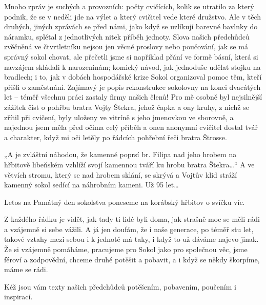 \documentclass[11pt]{article}
\begin{document}
Mnoho zpráv je suchých a provozních: počty cvičících, kolik se utratilo
za který podnik, že se v neděli jde na výlet a který cvičitel vede které
družstvo. Ale v těch druhých, jiných zprávách se před námi, jako když se
uzlíkují barevné bavlnky do náramku, splétal z jednotlivých nitek příběh
jednoty. Slova našich předchůdců zvěčněná ve čtvrtletníku nejsou jen
věcné proslovy nebo poučování, jak se má správný sokol chovat, ale
přečetli jsme si například přání ve formě básní, která si navzájem
skládali k narozeninám; komický návod, jak jednoduše udělat stojku na
bradlech; i to, jak v dobách hospodářské krize Sokol organizoval pomoc
těm, kteří přišli o zaměstnání. Zajímavý je popis rekonstrukce sokolovny
na konci dvacátých let -- téměř všechnu práci zastaly firmy našich
členů! Pro mě osobně byl nejsilnější zážitek číst o pohřbu bratra Vojty
Štekra, jehož čapka a ony kruhy, z nichž se zřítil při cvičení, byly
uloženy ve vitríně s jeho jmenovkou ve sborovně, a najednou jsem měla
před očima celý příběh a onen anonymní cvičitel dostal tvář a charakter,
když mi oči letěly po řádcích pohřební řeči bratra Štrosse.

„A je zvláštní náhodou, že kamenné poprsí br. Filipa nad jeho hrobem na
hřbitově libeňském vzhlíží svojí kamennou tváří ku hrobu bratra
Štekra\ldots`` A ve větvích stromu, který se nad hrobem sklání, se
skrývá a Vojtův klid stráží kamenný sokol sedící na náhrobním kameni. Už
95 let\ldots{}

Letos na Památný den sokolstva poneseme na korábský hřbitov o svíčku
víc.

Z každého řádku je vidět, jak tady ti lidé byli doma, jak strašně moc se
měli rádi a vzájemně si sebe vážili. A já jen doufám, že i naše
generace, po téměř stu let, takové vztahy mezi sebou i k jednotě má
taky, i když to už dáváme najevo jinak. Že si vzájemně pomáháme,
pracujeme pro Sokol jako pro společnou věc, jsme féroví a zodpovědní,
chceme druhé potěšit a pobavit, a i když se někdy škorpíme, máme se
rádi.

Kéž jsou vám texty našich předchůdců potěšením, pobavením, poučením i
inspirací.

\signature{Vaše vzdělavatelka Anka}


\clearpage

\restoregeometry
\pagestyle{stare-zpravy}

\setlength{\parindent}{0pt}
\newlength{\imagewidth}
\setlength{\imagewidth}{\textwidth}

\vspace{\baselineskip}
\end{document}
